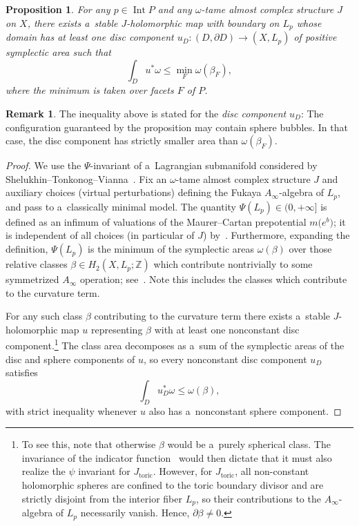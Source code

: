 \documentclass[pdftex]{sigma}
\numberwithin{equation}{section}
\newcommand{\bZ}{{\mathbb Z}}
\newtheorem{Proposition}[Theorem]{Proposition}
\theoremstyle{definition}
\newtheorem{rem}[Theorem]{Remark}
\begin{document}
\begin{Proposition}\label{prop:toric-disc-Psi}
For any $p\in \operatorname{Int} P$ and any $\omega$-tame almost complex structure $J$ on $X$, there exists a~stable $J$-holomorphic map with boundary on $L_p$ whose domain has at least one disc component $u_D\colon (D,\partial D)\to (X,L_p)$ of positive symplectic area such that
\[
\int_D u^*\omega \le \min_{F}\omega(\beta_F),
\]
where the minimum is taken over facets $F$ of $P$.
\end{Proposition}
\begin{rem}
 The inequality above is stated for the \emph{disc component} $u_D$: The configuration guaranteed by the proposition may contain sphere bubbles. In that case, the disc component has strictly smaller area than $\omega(\beta_F)$.
 \end{rem}
\begin{proof}
We use the $\Psi$-invariant of a~Lagrangian submanifold considered by Shelukhin--Tonko\-nog--Vianna~\cite{STVFluxShape}.
Fix an $\omega$-tame almost complex structure $J$ and auxiliary choices (virtual perturbations) defining the Fukaya $A_\infty$-algebra of $L_p$, and pass to a~classically minimal model.
The quantity $\Psi(L_p)\in(0,+\infty]$ is defined as an infimum of valuations of the Maurer--Cartan prepotential $m\bigl(e^{b}\bigr)$; it is independent of all choices (in particular of $J$) by~\cite[Theorem~4.2]{STVFluxShape}.
Furthermore, expanding the definition, $\Psi(L_p)$ is the minimum of the symplectic areas $\omega(\beta)$ over those relative classes $\beta\in H_{2}(X,L_p;\bZ)$ which contribute nontrivially to some symmetrized $A_\infty$ operation; see~\cite[Theorem~4.8]{STVFluxShape}. Note this includes the classes which contribute to the curvature term.

For any such class $\beta$ contributing to the curvature term there exists a~stable $J$-holomorphic map $u$ representing $\beta$ with at least one nonconstant disc component.\footnote{To see this, note that otherwise $\beta$ would be a~purely spherical class. The invariance of the indicator function~\cite[Proposition~5.1]{STVFluxShape} would then dictate that it must also realize the $\psi$ invariant for $J_{\mathrm{toric}}$.
However, for $J_{\mathrm{toric}}$, all non-constant holomorphic spheres are confined to the toric boundary divisor and are strictly disjoint from the interior fiber $L_p$, so their contributions to the $A_\infty$-algebra of $L_p$ necessarily vanish.
Hence, $\partial \beta \neq 0$.}
The class area decomposes as a~sum of the symplectic areas of the disc and sphere components of $u$, so every nonconstant disc component $u_D$ satisfies
\[
\int_D u_D^*\omega \le \omega(\beta),
\]
with strict inequality whenever $u$ also has a~nonconstant sphere component.


\end{proof}
\end{document}
